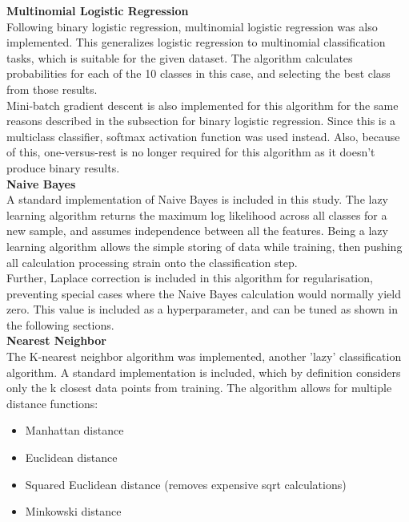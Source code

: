 \documentclass[11pt,a4paper]{article}
\begin{document}
\noindent
\textbf{Multinomial Logistic Regression}\\

\noindent Following binary logistic regression, multinomial logistic regression was also implemented. This generalizes logistic regression to multinomial classification tasks, which is suitable for the given dataset. The algorithm calculates probabilities for each of the 10 classes in this case, and selecting the best class from those results.\\

\noindent Mini-batch gradient descent is also implemented for this algorithm for the same reasons described in the subsection for binary logistic regression. Since this is a multiclass classifier, softmax activation function was used instead. Also, because of this, one-versus-rest is no longer required for this algorithm as it doesn't produce binary results.\\

\noindent
\textbf{Naive Bayes}\\

\noindent A standard implementation of Naive Bayes is included in this study. The lazy learning algorithm returns the maximum log likelihood across all classes for a new sample, and assumes independence between all the features. Being a lazy learning algorithm allows the simple storing of data while training, then pushing all calculation processing strain onto the classification step.\\

\noindent Further, Laplace correction is included in this algorithm for regularisation, preventing special cases where the Naive Bayes calculation would normally yield zero. This value is included as a hyperparameter, and can be tuned as shown in the following sections.\\

\noindent
\textbf{Nearest Neighbor}\\

\noindent The K-nearest neighbor algorithm was implemented, another 'lazy' classification algorithm. A standard implementation is included, which by definition considers only the k closest data points from training. The algorithm allows for multiple distance functions:\\

\begin{itemize}
    \item Manhattan distance
    \item Euclidean distance
    \item Squared Euclidean distance (removes expensive sqrt calculations)
    \item Minkowski distance\\
\end{itemize}
\end{document}
